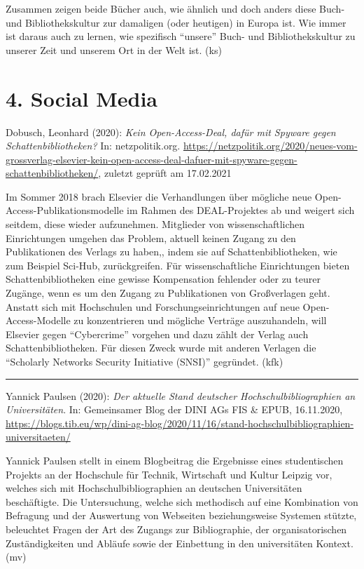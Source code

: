 \documentclass[a4paper,
fontsize=11pt,
oneside,
numbers=noperiodatend,
parskip=half-,
bibliography=totoc,
final
]{scrartcl}
\begin{document}
Zusammen zeigen beide Bücher auch, wie ähnlich und doch anders diese
Buch- und Bibliothekskultur zur damaligen (oder heutigen) in Europa ist.
Wie immer ist daraus auch zu lernen, wie spezifisch \enquote{unsere}
Buch- und Bibliothekskultur zu unserer Zeit und unserem Ort in der Welt
ist. (ks)

\hypertarget{social-media}{%
\section{4. Social Media}\label{social-media}}

Dobusch, Leonhard (2020): \emph{Kein Open-Access-Deal, dafür mit Spyware
gegen Schattenbibliotheken?} In: netzpolitik.org.
\url{https://netzpolitik.org/2020/neues-vom-grossverlag-elsevier-kein-open-access-deal-dafuer-mit-spyware-gegen-schattenbibliotheken/},
zuletzt geprüft am 17.02.2021

Im Sommer 2018 brach Elsevier die Verhandlungen über mögliche neue
Open-Access-Publikationsmodelle im Rahmen des DEAL-Projektes ab und
weigert sich seitdem, diese wieder aufzunehmen. Mitglieder von
wissenschaftlichen Einrichtungen umgehen das Problem, aktuell keinen
Zugang zu den Publikationen des Verlags zu haben,, indem sie auf
Schattenbibliotheken, wie zum Beispiel Sci-Hub, zurückgreifen. Für
wissenschaftliche Einrichtungen bieten Schattenbibliotheken eine gewisse
Kompensation fehlender oder zu teurer Zugänge, wenn es um den Zugang zu
Publikationen von Großverlagen geht. Anstatt sich mit Hochschulen und
Forschungseinrichtungen auf neue Open-Access-Modelle zu konzentrieren
und mögliche Verträge auszuhandeln, will Elsevier gegen
\enquote{Cybercrime} vorgehen und dazu zählt der Verlag auch
Schattenbibliotheken. Für diesen Zweck wurde mit anderen Verlagen die
\enquote{Scholarly Networks Security Initiative (SNSI)} gegründet. (kfk)

\begin{center}\rule{0.5\linewidth}{0.5pt}\end{center}

Yannick Paulsen (2020): \emph{Der aktuelle Stand deutscher
Hochschulbibliographien an Universitäten}. In: Gemeinsamer Blog der DINI
AGs FIS \& EPUB, 16.11.2020,
\url{https://blogs.tib.eu/wp/dini-ag-blog/2020/11/16/stand-hochschulbibliographien-universitaeten/}

Yannick Paulsen stellt in einem Blogbeitrag die Ergebnisse eines
studentischen Projekts an der Hochschule für Technik, Wirtschaft und
Kultur Leipzig vor, welches sich mit Hochschulbibliographien an
deutschen Universitäten beschäftigte. Die Untersuchung, welche sich
methodisch auf eine Kombination von Befragung und der Auswertung von
Webseiten beziehungsweise Systemen stützte, beleuchtet Fragen der Art
des Zugangs zur Bibliographie, der organisatorischen Zuständigkeiten und
Abläufe sowie der Einbettung in den universitäten Kontext. (mv)
\end{document}
